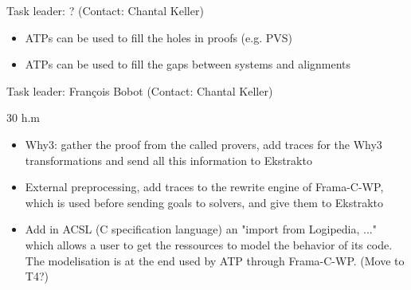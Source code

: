 \begin{workpackage}[id=atpetc,wphases=0-48,type=RTD,
  short=ATPs etc.,%
  title={ATP, SAT, SMT, Model checkers},
  lead=Lie,
  LieRM=10]
\begin{tasklist}
\begin{task}[id=reconstruction, title=ATPs for Logipedia]
\end{task}


\begin{task}[id=readiness, title=Using ATPs to increase Logipedia readiness]
  Task leader: ?
  (Contact: Chantal Keller)

\begin{itemize}
\item ATPs can be used to fill the holes in proofs (e.g. PVS)
\item ATPs can be used to fill the gaps between systems and alignments
\end{itemize}

\end{task}


\begin{task}[id=cooperation, title=Make ATPs cooperate]
  Task leader: François Bobot (Contact: Chantal Keller)

  30 h.m

\begin{itemize}
\item Why3: gather the proof from the called provers, add traces for the
  Why3 transformations and send all this information to Ekstrakto
\item External preprocessing, add traces to the rewrite engine of
  Frama-C-WP, which is used before sending goals to solvers, and give
  them to Ekstrakto
\item Add in ACSL (C specification language) an "import from Logipedia,
  ..." which allows a user to get the ressources to model the behavior
  of its code. The modelisation is at the end used by ATP through
  Frama-C-WP. (Move to T4?)
\end{itemize}

\end{task}
\end{tasklist}




\end{workpackage}
